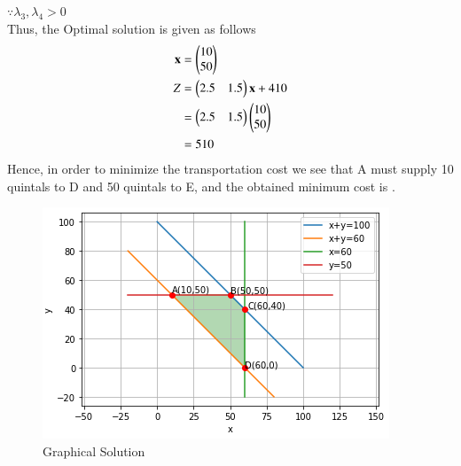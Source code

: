 \documentclass[journal,12pt,twocolumn]{IEEEtran}
\begin{document}
$\because \lambda_3,\lambda_4 > 0 $
\\
Thus, the Optimal solution is given as follows
\begin{align}
    \mathbf{x} &= \begin{pmatrix}10\\50\end{pmatrix} \\
    Z &= \begin{pmatrix}2.5 & 1.5\end{pmatrix}\mathbf{x} + 410 \\
    &= \begin{pmatrix}2.5 & 1.5\end{pmatrix}\begin{pmatrix}10 \\ 50\end{pmatrix} \\
    &= 510
\end{align}
Hence, in order to minimize the transportation cost we see that A must supply 10 quintals to D and 50 quintals to E, and the obtained minimum cost is .
\begin{figure}[!ht]
\centering
\includegraphics[width=\columnwidth]{graphical solution.PNG}
\caption{Graphical Solution}
\label{fig:Graphical Solution}	
\end{figure}
\end{document}
